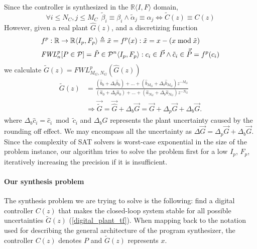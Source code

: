 \documentclass[final]{sig-alternate-05-2015}
\begin{document}
Since the controller is synthesized in the $\mathbb{R}\langle I,F \rangle$
domain,
%
$$\forall i \leq N_C, j \leq M_C\ \  \tilde \beta_{i} \equiv \beta_{i} \wedge \tilde \alpha_{j} \equiv \alpha_{j} \Leftrightarrow \tilde C(z) \equiv C(z)$$
%
However, given a real plant $\hat{G}(z)$, and a discretizing function
%
\begin{align}
\small
\label{FWL_tf}
&f^p : \mathbb{R} \rightarrow  \mathbb{R}\langle I_p,F_p \rangle \triangleq \tilde x = f^p(x) : \tilde x=x-(x\bmod\tilde x)\\
&\mathit{FWL}_n^p[P \in \mathcal{P}] = \tilde P \in \mathcal{P}^{n}\langle I_p,F_p \rangle : c_i \in \vec{P} \wedge \tilde c_i \in \vec{\tilde{P}}=f^p(c_i)  \nonumber
\end{align}
%
we calculate $\tilde G(z)=\mathit{FWL}_{M_G,N_G}^p(\hat{G}(z))$
%
\begin{align}
%
\label{digital_plant_tf}
\tilde G(z)&=\frac{(\hat{b}_{0}+\Delta_b \hat{b}_{0}) +...+(\hat{b}_{M_G}+\Delta_b \hat{b}_{M_G})z^{-M_G}}{(\hat{a}_{0}+\Delta_b \hat{a}_{0})+...+(\hat{a}_{N_G}+\Delta_b \hat{a}_{N_G})z^{-N_G}} \nonumber \\
&\Rightarrow \vec{\tilde G} =\vec{\hat{G}}+\Delta_b{\vec{G}}=\vec{G}+\Delta_p{\vec{G}}+\Delta_b{\vec{G}}.
\end{align}
%
where $\Delta_b\hat{c}_i=\hat{c}_i\bmod \tilde{c}_i$
and $\Delta_b{G}$ represents the plant uncertainty caused by
the rounding off effect.  We may encompass all the uncertainty as
$\Delta{\vec{G}}=\Delta_p{\vec{G}}+\Delta_b{\vec{G}}$. 
Since the complexity of SAT solvers is worst-case exponential in the size of
the problem instance, our algorithm tries to solve the problem first for a
low $I_p$, $F_p$, iteratively increasing the precision if it is insufficient.

\paragraph{Our synthesis problem}
The synthesis problem we are trying to solve is the following:
find a digital controller $C(z)$ %
that makes the closed-loop system stable 
for all possible uncertainties 
$\tilde G(z)$ (\ref{digital_plant_tf}).
When mapping back to the notation used for describing the general architecture 
of the program synthesizer, the controller $C(z)$ denotes $P$ and 
$\tilde G(z)$ represents $x$. 
\end{document}
